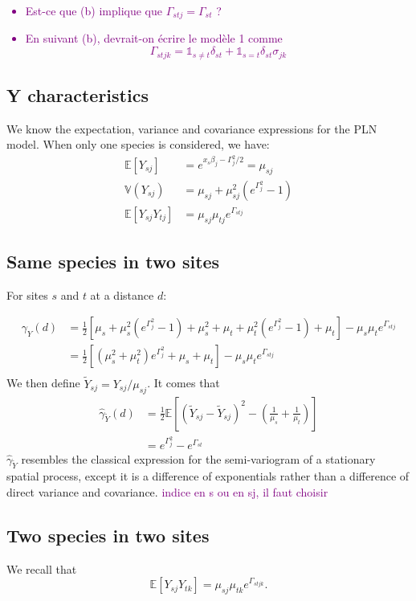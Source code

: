 \documentclass[10pt,a4paper]{article}
\newcommand{\esp}{\mathds{E}}
\newcommand{\var}{\mathds{V}}
\newcommand{\RM}{\textcolor{purple}}
\begin{document}
\RM{\begin{itemize}
\item Est-ce que (b) implique que $\Gamma_{stj} = \Gamma_{st}$ ? \item En suivant (b), devrait-on écrire le modèle 1 comme 
$$ \Gamma_{stjk} =   \mathds{1}_{s\neq t} \delta_{st} + \mathds{1}_{s=t} \delta_{st} \sigma_{jk}$$  
\end{itemize} }
\subsection{Y characteristics}
We know the expectation, variance and covariance expressions for the PLN model. When only one species is considered, we have:
\begin{align*}
\esp[Y_{sj}] &= e^{x_s\beta _j- \Gamma_{j}^2/2} = \mu_{sj}\\
\var(Y_{sj}) &= \mu_{sj}+\mu_{sj}^2(e^{\Gamma_{j}^2} - 1)\\
\esp[Y_{sj}Y_{tj}]&= \mu_{sj}\mu_{tj} e^{\Gamma_{stj}}
\end{align*}

\subsection{Same species in two sites}
For sites $s$ and $t$ at a distance $d$:

\begin{align*}
\gamma_Y(d) &= \frac{1}{2} \left[ \mu_s + \mu_s^2(e^{\Gamma^2_j}-1) + \mu_s^2 + \mu_t+\mu_t^2(e^{\Gamma^2_j}-1) +\mu_t\right] - \mu_s\mu_te^{\Gamma_{stj}}\\
&= \frac{1}{2} \left[ ( \mu_s^2+\mu_t^2)e^{\Gamma^2_j}+ \mu_s+ \mu_t\right] - \mu_s\mu_te^{\Gamma_{stj}}\\
\end{align*}
We then define $\tilde{Y}_{sj}= Y_{sj}/\mu_{sj}$.
It  comes that 
\begin{align*}
 \hat{\gamma}_{\tilde{Y}}(d) &= \frac{1}{2} \esp \left[(\tilde{Y}_{sj}-\tilde{Y}_{sj})^2 - (\frac{1}{\mu_s}+\frac{1}{\mu_t})\right]\\
 &=e^{\Gamma_j^2} - e^{\Gamma_{st}}
\end{align*}
$ \hat{\gamma}_{\tilde{Y}}$ resembles the classical expression for the semi-variogram of a stationary spatial process, except it is a difference of exponentials rather than a difference of direct variance and covariance. 
\RM{indice en s ou en sj, il faut choisir}
\subsection{Two species in two sites}
We recall that
$$\esp[Y_{sj}Y_{tk}]= \mu_{sj}\mu_{tk} e^{\Gamma_{stjk}}.$$
\end{document}
